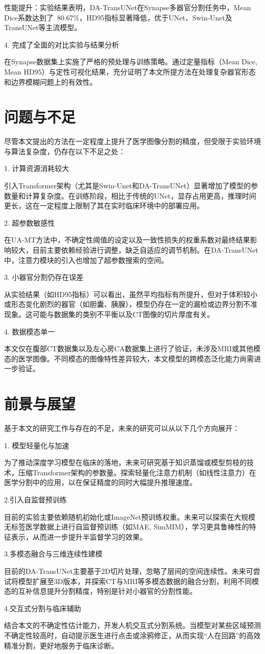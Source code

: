 \documentclass[twoside,openright]{xduugthesis}
\begin{document}
性能提升：实验结果表明，DA-TransUNet在Synapse多器官分割任务中，Mean Dice系数达到了 80.67\%，HD95指标显著降低，优于UNet、Swin-Unet及TransUNet等主流模型。

4. 完成了全面的对比实验与结果分析

在Synapse数据集上实施了严格的预处理与训练策略。通过定量指标（Mean Dice, Mean HD95）与定性可视化结果，充分证明了本文所提方法在处理复杂器官形态和边界模糊问题上的有效性。

\section{问题与不足}
尽管本文提出的方法在一定程度上提升了医学图像分割的精度，但受限于实验环境与算法复杂度，仍存在以下不足之处：

1. 计算资源消耗较大

	引入Transformer架构（尤其是Swin-Unet和DA-TransUNet）显著增加了模型的参数量和计算复杂度。在训练阶段，相比于传统的UNet，显存占用更高，推理时间更长，这在一定程度上限制了其在实时临床环境中的部署应用。
    
2. 超参数敏感性

	在UA-MT方法中，不确定性阈值的设定以及一致性损失的权重系数对最终结果影响较大，目前主要依赖经验进行调整，缺乏自适应的调节机制。在DA-TransUNet中，注意力模块的引入也增加了超参数搜索的空间。
    
3. 小器官分割仍存在误差

	从实验结果（如HD95指标）可以看出，虽然平均指标有所提升，但对于体积较小或形态变化剧烈的器官（如胆囊、胰腺），模型仍存在一定的漏检或边界分割不准现象。这可能与数据集的类别不平衡以及CT图像的切片厚度有关。
    
4. 数据模态单一

	本文仅在腹部CT数据集以及左心房CA数据集上进行了验证，未涉及MRI或其他模态的医学图像。不同模态的图像特性差异较大，本文模型的跨模态泛化能力尚需进一步验证。

\section{前景与展望}
基于本文的研究工作与存在的不足，未来的研究可以从以下几个方向展开：

1. 模型轻量化与加速

	为了推动深度学习模型在临床的落地，未来可研究基于知识蒸馏或模型剪枝的技术，压缩Transformer架构的参数量。探索轻量化注意力机制（如线性注意力）在医学分割中的应用，以在保证精度的同时大幅提升推理速度。
    
2.引入自监督预训练

	目前的实验主要依赖随机初始化或ImageNet预训练权重。未来可以探索在大规模无标签医学数据上进行自监督预训练（如MAE, SimMIM），学习更具鲁棒性的特征表示，从而进一步提升半监督学习的效果。
    
3.多模态融合与三维连续性建模

	目前的DA-TransUNet主要基于2D切片处理，忽略了层间的空间连续性。未来可尝试将模型扩展至3D版本，并探索CT与MRI等多模态数据的融合分割，利用不同模态的互补信息提升分割精度，特别是针对小器官的分割性能。
    
4.交互式分割与临床辅助

	结合本文的不确定性估计能力，开发人机交互式分割系统。当模型对某些区域预测不确定性较高时，自动提示医生进行点击或涂鸦修正，从而实现“人在回路”的高效精准分割，更好地服务于临床诊断。
\end{document}
